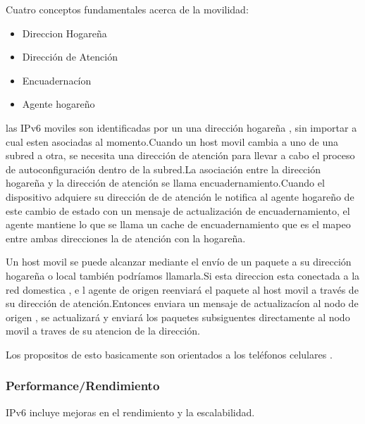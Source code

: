 \documentclass[11pt,a4paper]{article}
\begin{document}
Cuatro conceptos fundamentales acerca de la movilidad:
\begin{itemize}
\item Direccion Hogareña
\item Dirección de Atención
\item Encuadernacíon
\item Agente hogareño

\end {itemize}
las IPv6 moviles son identificadas por un una dirección hogareña , sin importar a cual esten asociadas al momento.Cuando un host movil cambia a uno de una subred a otra, se necesita una dirección de atención para llevar a cabo el proceso de autoconfiguración dentro de la subred.La asociación entre la dirección hogareña y la dirección de atención se llama encuadernamiento.Cuando el dispositivo adquiere su dirección de de atención le notifica al agente hogareño de este cambio de estado con un mensaje de  actualización de encuadernamiento, el agente mantiene lo que se llama un cache de encuadernamiento que es el mapeo entre ambas direcciones la de atención con la hogareña.
\par Un host movil se puede alcanzar mediante el envío de un paquete a su dirección hogareña o local también podríamos llamarla.Si esta direccion esta conectada a la red domestica , e l agente de origen reenviará el paquete al host movil a través de su dirección de atención.Entonces enviara un mensaje de actualizacíon al nodo de origen , se actualizará y enviará los paquetes subsiguentes directamente al nodo movil a traves de su atencion  de la dirección. \par 
Los propositos de esto basicamente son orientados a los teléfonos celulares .
\subsubsection{Performance/Rendimiento}
IPv6 incluye mejoras en el rendimiento y la escalabilidad.
\end{document}
